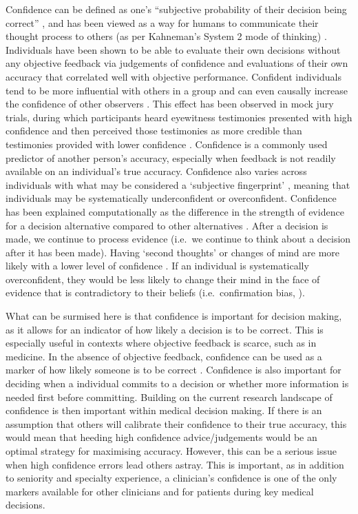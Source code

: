 \documentclass[a4paper, nobind]{templates/ociamthesis}
\begin{document}
Confidence can be defined as one's ``subjective probability of their decision being correct'' \autocite{fleming_self-evaluation_2017}, and has been viewed as a way for humans to communicate their thought process to others (as per Kahneman's System 2 mode of thinking) \autocite{shea_supra-personal_2014}. Individuals have been shown to be able to evaluate their own decisions without any objective feedback via judgements of confidence \autocite{henmon_relation_1911} and evaluations of their own accuracy \autocite{rabbitt_three_1968} that correlated well with objective performance. Confident individuals tend to be more influential with others in a group \autocite{zarnoth_social_1997} and can even causally increase the confidence of other observers \autocite{cheng_social_2021}. This effect has been observed in mock jury trials, during which participants heard eyewitness testimonies presented with high confidence and then perceived those testimonies as more credible than testimonies provided with lower confidence \autocite{cutler_eyewitness_1989,roediger_iii_curious_2012}. Confidence is a commonly used predictor of another person's accuracy, especially when feedback is not readily available on an individual's true accuracy. Confidence also varies across individuals with what may be considered a `subjective fingerprint' \autocite{ais_individual_2016}, meaning that individuals may be systematically underconfident or overconfident. Confidence has been explained computationally as the difference in the strength of evidence for a decision alternative compared to other alternatives \autocite{vickers_effects_1982}. After a decision is made, we continue to process evidence (i.e.~we continue to think about a decision after it has been made). Having `second thoughts' or changes of mind are more likely with a lower level of confidence \autocite{charles_dynamic_2019}. If an individual is systematically overconfident, they would be less likely to change their mind in the face of evidence that is contradictory to their beliefs (i.e.~confirmation bias, \textcite{nickerson_confirmation_1998}).

\hfill\break
What can be surmised here is that confidence is important for decision making, as it allows for an indicator of how likely a decision is to be correct. This is especially useful in contexts where objective feedback is scarce, such as in medicine. In the absence of objective feedback, confidence can be used as a marker of how likely someone is to be correct \autocite{price_intuitive_2004}. Confidence is also important for deciding when a individual commits to a decision or whether more information is needed first before committing. Building on the current research landscape of confidence is then important within medical decision making. If there is an assumption that others will calibrate their confidence to their true accuracy, this would mean that heeding high confidence advice/judgements would be an optimal strategy for maximising accuracy. However, this can be a serious issue when high confidence errors lead others astray. This is important, as in addition to seniority and specialty experience, a clinician's confidence is one of the only markers available for other clinicians and for patients during key medical decisions.
\end{document}
